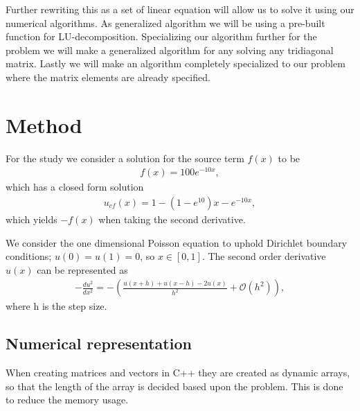 \documentclass{emulateapj}
\begin{document}
Further rewriting this as a set of linear equation will allow us to solve it using our numerical algorithms. As generalized algorithm we will be using a pre-built function for LU-decomposition. Specializing our algorithm further for the problem we will make a generalized algorithm for any solving any tridiagonal matrix. Lastly we will make an algorithm completely specialized to our problem where the matrix elements are already specified. 



\section{Method}
\label{sec:method}
For the study we consider a solution for the source term $f(x)$ to be
%
\begin{gather*}\label{eq:f(x)}
    f(x) = 100e^{-10x},
\end{gather*}
%
which has a closed form solution 
%
\begin{gather}\label{eq:u(x)}
u_{cf}(x) = 1-(1-e^{10})x-e^{-10x},
\end{gather}
%
which yields $-f(x)$ when taking the second derivative. 

We consider the one dimensional Poisson equation to uphold Dirichlet boundary conditions; $u(0)=u(1)=0$, so $x \in [0,1]$. The second order derivative $u(x)$ can be represented as
%
\begin{gather}\label{eq:du/dx}
 -\frac{du^2}{dx^2} = -\left(\frac{u(x+h) + u(x-h) - 2u(x)}{h^2} + \mathcal{O}(h^2)\right),
\end{gather}
%
where h is the step size. 

\subsection{Numerical representation}
When creating matrices and vectors in C++ they are created as dynamic arrays, so that the length of the array is decided based upon the problem. This is done to reduce the memory usage.
\end{document}
